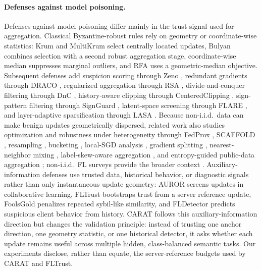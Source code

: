 \paragraph{Defenses against model poisoning.}
Defenses against model poisoning differ mainly in the trust signal used for aggregation. Classical Byzantine-robust rules rely on geometry or coordinate-wise statistics: Krum and MultiKrum \citep{blanchard2017krum} select centrally located updates, Bulyan \citep{elmhamdi2018bulyan} combines selection with a second robust aggregation stage, coordinate-wise median \citep{yin2018median} suppresses marginal outliers, and RFA \citep{pillutla2022rfa} uses a geometric-median objective. Subsequent defenses add suspicion scoring through Zeno \citep{xie2019zeno}, redundant gradients through DRACO \citep{chen2018draco}, regularized aggregation through RSA \citep{li2019rsa}, divide-and-conquer filtering through DnC \citep{shejwalkar2021manipulating}, history-aware clipping through CenteredClipping \citep{karimireddy2021history}, sign-pattern filtering through SignGuard \citep{xu2022signguard}, latent-space screening through FLARE \citep{wang2022flare}, and layer-adaptive sparsification through LASA \citep{xu2025lasa}. Because non-i.i.d.\ data can make benign updates geometrically dispersed, related work also studies optimization and robustness under heterogeneity through FedProx \citep{li2020fedprox}, SCAFFOLD \citep{karimireddy2020scaffold}, resampling \citep{he2021resampling}, bucketing \citep{karimireddy2022bucketing}, local-SGD analysis \citep{data2021localsgd}, gradient splitting \citep{liu2023gas}, nearest-neighbor mixing \citep{allouah2023fixing}, label-skew-aware aggregation \citep{bao2024boba}, and entropy-guided public-data aggregation \citep{huang2024sdea}; non-i.i.d.\ FL surveys provide the broader context \citep{zhu2021noniidsurvey}. Auxiliary-information defenses use trusted data, historical behavior, or diagnostic signals rather than only instantaneous update geometry: AUROR \citep{shen2016auror} screens updates in collaborative learning, FLTrust \citep{cao2021fltrust} bootstraps trust from a server reference update, FoolsGold \citep{fung2020foolsgold} penalizes repeated sybil-like similarity, and FLDetector \citep{zhang2022fldetector} predicts suspicious client behavior from history. CARAT follows this auxiliary-information direction but changes the validation principle: instead of trusting one anchor direction, one geometry statistic, or one historical detector, it asks whether each update remains useful across multiple hidden, class-balanced semantic tasks. Our experiments disclose, rather than equate, the server-reference budgets used by CARAT and FLTrust.
